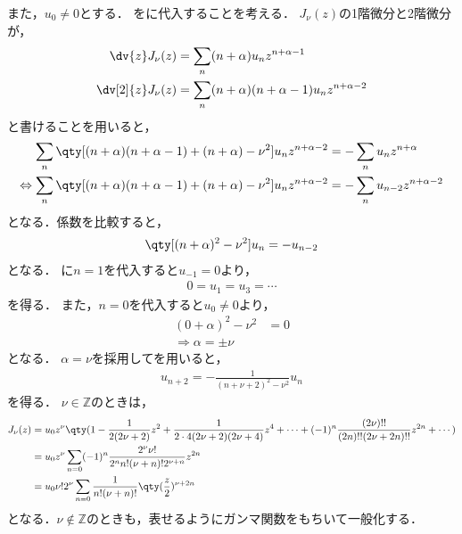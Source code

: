 \documentclass{report}
\begin{document}
      また，$u_0 \neq 0$とする．
      をに代入することを考える．
      $J_{\nu}(z)$の1階微分と2階微分が，
      \begin{align}
        \dv{z}J_{\nu}(z) &= \sum_{n}(n + \alpha)u_nz^{n + \alpha - 1} \\ 
        \dv[2]{z}J_{\nu}(z) &= \sum_{n}(n + \alpha)(n + \alpha - 1)u_nz^{n + \alpha - 2} 
      \end{align}
      と書けることを用いると，
      \begin{align}
        \sum_{n}\qty[(n + \alpha)(n + \alpha - 1) + (n + \alpha) - \nu^2]u_nz^{n + \alpha - 2} &= -\sum_{n}u_nz^{n + \alpha} \\ 
        \Leftrightarrow \sum_{n}\qty[(n + \alpha)(n + \alpha - 1) + (n + \alpha) - \nu^2]u_nz^{n + \alpha - 2} &= -\sum_{n}u_{n - 2}z^{n + \alpha -2} 
      \end{align}
      となる．係数を比較すると，
      \begin{align}
        \qty[(n + \alpha)^2 - \nu^2]u_n = -u_{n - 2}\label{bessel-func-recurr}
      \end{align}
      となる．
      に$n = 1$を代入すると$u_{-1} = 0$より，
      \begin{align}
        0 = u_1 = u_3 = \cdots
      \end{align}
      を得る．
      また，$n = 0$を代入すると$u_0 \neq 0$より，
      \begin{align}
        (0 + \alpha)^2 - \nu^2 &= 0 \\ 
        \Rightarrow \alpha = \pm \nu
      \end{align}
      となる．
      $\alpha = \nu$を採用してを用いると，
      \begin{align}
        u_{n + 2} = -\frac{1}{(n + \nu + 2)^2 - \nu^2}u_n 
      \end{align}
      を得る．
      $\nu \in \mathbb{Z}$のときは，
      \begin{align}
        J_{\nu}(z) &= u_0z^{\nu}\qty(1 - \frac{1}{2(2\nu + 2)}z^2 + \frac{1}{2\cdot 4(2\nu + 2)(2\nu + 4)}z^4 + \cdots + (-1)^n\frac{(2\nu)!!}{(2n)!!(2\nu + 2n)!!}z^{2n} + \cdots) \\ 
        &= u_0z^{\nu}\sum_{n = 0}(-1)^n\frac{2^{\nu}\nu!}{2^nn!(\nu + n)!2^{\nu + n}} z^{2n} \\ 
        &= u_0\nu!2^{\nu}\sum_{n = 0}\frac{1}{n!(\nu + n)!}\qty(\frac{z}{2})^{\nu + 2n}
      \end{align}
      となる．$\nu \notin \mathbb{Z}$のときも，表せるようにガンマ関数をもちいて一般化する．
\end{document}
